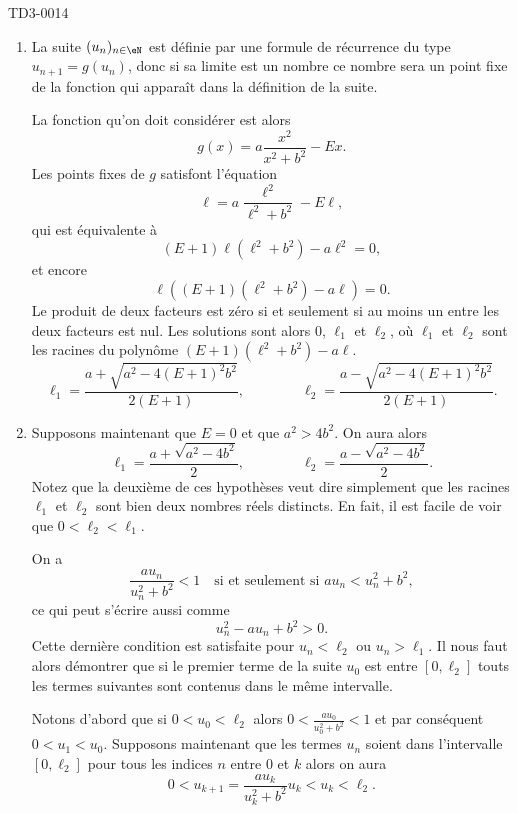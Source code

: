 
\begin{corrige}{TD3-0014}

  \begin{enumerate}
  \item La suite $(u_n)_{n\in\eN}$ est définie par une formule de récurrence du type $u_{n+1}=g(u_n)$, donc si sa limite est un nombre ce nombre sera un point fixe de la fonction qui appara\^{i}t dans la  définition de la suite. 

La fonction qu'on doit considérer est alors 
\[
g(x)= a\frac{x^2}{x^2+b^2}-Ex.
\] 
Les points fixes de $g$ satisfont l'équation
\[
\ell = a\frac{\ell^2}{\ell^2+b^2}-E\ell, 
\]
qui est équivalente à 
\[
(E+1)\ell (\ell^2+b^2)-a \ell^2 =0,
\]
et encore 
\[
\ell \left((E+1)(\ell^2+b^2)-a \ell\right)=0.
\]
Le produit de deux facteurs est zéro si et seulement si au moins un entre les deux facteurs est nul. Les solutions sont  alors $0$, $\ell_1$ et $\ell_2$, où $\ell_1 $ et $\ell_2$ sont les racines du polynôme $(E+1)(\ell^2+b^2)-a \ell$.
\[
\ell_1 =\frac{a+\sqrt{a^2-4(E+1)^2b^2}}{2(E+1)}, \qquad\qquad\ell_2 =\frac{a-\sqrt{a^2-4(E+1)^2b^2}}{2(E+1)}.
\]
\item       \label{Itemtzziqtrois}
    Supposons maintenant que $E=0$ et que $a^2>4b^2$. On aura alors 
\[
\ell_1 =\frac{a+\sqrt{a^2-4b^2}}{2}, \qquad\qquad\ell_2 =\frac{a-\sqrt{a^2-4b^2}}{2}.
\]
 Notez que la deuxième de ces hypothèses veut dire simplement que les racines $\ell_1$ et $\ell_2$ sont bien deux nombres réels distincts. En fait, il est facile de voir que $0<\ell_2<\ell_1$.  

On a  
\[
\frac{au_n}{u_n^2+b^2}< 1 \quad\textrm{si et seulement si } au_n< u_n^2+b^2, 
\]
ce qui peut s'écrire aussi comme
\[
u_n^2-au_n+b^2>0.
\]
Cette dernière condition est satisfaite pour $u_n< \ell_2$ ou $u_n> \ell_1$. Il nous faut alors démontrer que si le premier terme de la suite $u_0$ est entre $[0,\ell_2]$ touts les termes suivantes sont contenus dans le même intervalle.

Notons d'abord que si $0<u_0<\ell_2$ alors $\displaystyle 0<\frac{a u_0}{u_0^2+b^2}<1$ et par conséquent $0<u_1<u_0$. Supposons maintenant que les termes $u_n$ soient dans l'intervalle $[0,\ell_2]$ pour  tous les indices $n$ entre $0$ et $k$ alors on aura 
\[
0<u_{k+1}=\frac{au_k}{u_k^2+b^2} u_k< u_k<\ell_2.
\]


\end{enumerate}
\end{corrige}
